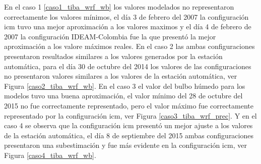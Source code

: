 En el caso 1 \ref{caso1_tiba_wrf_wb} los valores modelados no representaron correctamente los valores mínimos, el día 3 de febrero del 2007 la configuración icm tuvo una mejor aproximación a los valores maximos y el día 4 de febrero de 2007 la configuración IDEAM-Colombia fue la que presentó la mejor aproximación a los valore máximos reales. En el caso 2 las ambas configuraciones presentaron resultados similares a los valores generados por la estación automática, para el día 30 de octubre del 2014 los valores de las configuraciones no presentaron valores similares a los valores de la estación automática, ver Figura \ref{caso2_tiba_wrf_wb}. En el caso 3 el valor del bulbo húmedo para los modelos tuvo una buena aproximación, el valor mínimo del 28 de octubre del 2015 no fue correctamente representado, pero el valor máximo fue correctamente representado por la configuración icm, ver Figura \ref{caso3_tiba_wrf_prec}. Y en el caso 4 se observa que la configuración icm presentó un mejor ajuste a los valores de la estación automática, el día 8 de septiembre del 2015 ambas configuraciones presentaron una subestimación y fue más evidente en la configuración icm, ver Figura \ref{caso4_tiba_wrf_wb}.\\


